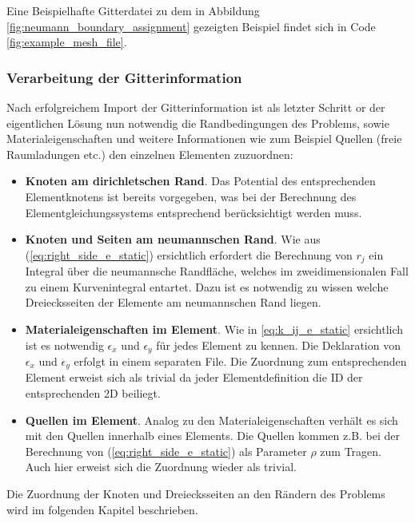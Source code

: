 Eine Beispielhafte Gitterdatei zu dem in Abbildung \ref{fig:neumann_boundary_assignment} gezeigten Beispiel findet sich in Code \ref{fig:example_mesh_file}.


\subsubsection{Verarbeitung der Gitterinformation}
Nach erfolgreichem Import der Gitterinformation ist als letzter Schritt or der eigentlichen Lösung nun notwendig die Randbedingungen des Problems, sowie Materialeigenschaften und weitere Informationen wie zum Beispiel Quellen (freie Raumladungen etc.) den einzelnen Elementen zuzuordnen: \newline

\begin{itemize}
	\item \textbf{Knoten am dirichletschen Rand}. Das Potential des entsprechenden Elementknotens ist bereits vorgegeben, was bei der Berechnung des Elementgleichungssystems entsprechend berücksichtigt werden muss.
	\item \textbf{Knoten und Seiten am neumannschen Rand}. Wie aus (\ref{eq:right_side_e_static}) ersichtlich erfordert die Berechnung von $r_j$ ein Integral über die neumannsche Randfläche, welches im zweidimensionalen Fall zu einem Kurvenintegral entartet. Dazu ist es notwendig zu wissen welche Dreiecksseiten der Elemente am neumannschen Rand liegen.
	\item \textbf{Materialeigenschaften im Element}. Wie in \ref{eq:k_ij_e_static} ersichtlich ist es notwendig $\epsilon_x$ und $\epsilon_y$ für jedes Element zu kennen. Die Deklaration von $\epsilon_x$ und $\epsilon_y$ erfolgt in einem separaten File. Die Zuordnung zum entsprechenden Element erweist sich als trivial da jeder Elementdefinition die ID der entsprechenden 2D  beiliegt.
	\item \textbf{Quellen im Element}. Analog zu den Materialeigenschaften verhält es sich mit den Quellen innerhalb eines Elements. Die Quellen kommen z.B. bei der Berechnung von (\ref{eq:right_side_e_static}) als Parameter $\rho$ zum Tragen. Auch hier erweist sich die Zuordnung wieder als trivial.
\end{itemize}

Die Zuordnung der Knoten und Dreiecksseiten an den Rändern des Problems wird im folgenden Kapitel beschrieben.

